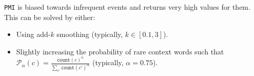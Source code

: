 \begin{description}
\begin{description}
                \begin{remark}
                    \texttt{PMI} is biased towards infrequent events and returns very high values for them. This can be solved by either:
                    \begin{itemize}
                        \item Using add-$k$ smoothing (typically, $k \in [0.1, 3]$).
                        \item Slightly increasing the probability of rare context words such that $\mathcal{P}_\alpha(c) = \frac{\texttt{count}(c)^\alpha}{\sum_{c'}\texttt{count}(c')^\alpha}$ (typically, $\alpha=0.75$).
                    \end{itemize}
                \end{remark}


\end{description}
\end{description}

